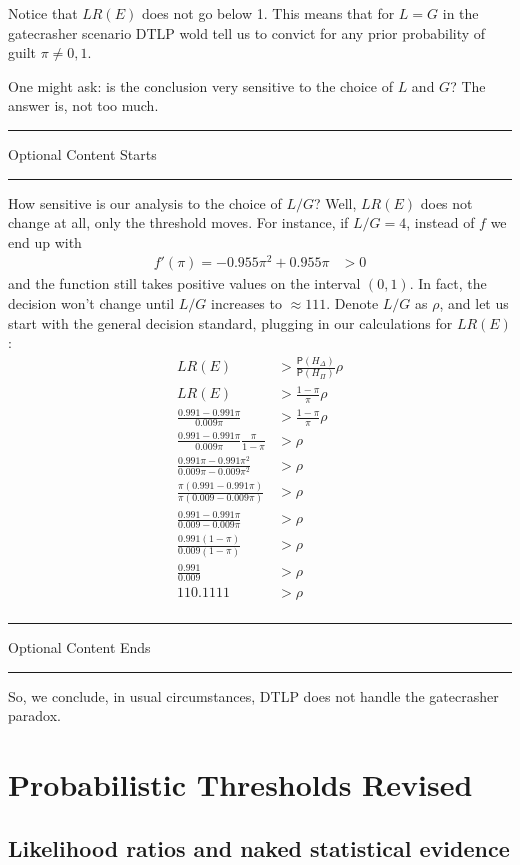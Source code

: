 \documentclass[10pt,dvipsnames,enabledeprecatedfontcommands]{scrartcl}
\newcommand{\pr}[1]{\mathsf{P}(#1)}
\newcommand{\intermezzoa}{
	\begin{minipage}[c]{13cm}
	\begin{center}\rule{10cm}{0.4pt}



	\tiny{\sc Optional Content Starts}
	
	\vspace{-1mm}
	
	\rule{10cm}{0.4pt}\end{center}
	\end{minipage}\nopagebreak 
	}
\newcommand{\intermezzob}{\nopagebreak 
	\begin{minipage}[c]{13cm}
	\begin{center}\rule{10cm}{0.4pt}

	\tiny{\sc Optional Content Ends}
	
	\vspace{-1mm}
	
	\rule{10cm}{0.4pt}\end{center}
	\end{minipage}
	}
\begin{document}
\noindent Notice that \(LR(E)\) does not go below 1. This means that for
\(L=G\) in the gatecrasher scenario DTLP wold tell us to convict for any
prior probability of guilt \(\pi\neq 0,1\).

One might ask: is the conclusion very sensitive to the choice of \(L\)
and \(G\)? The answer is, not too much.

\intermezzoa

How sensitive is our analysis to the choice of \(L/G\)? Well, \(LR(E)\)
does not change at all, only the threshold moves. For instance, if
\(L/G=4\), instead of \(f\) we end up with \begin{align*}
 f'(\pi) = - 0.955 \pi^2 + 0.955\pi &>0 
 \end{align*} and the function still takes positive values on the
interval \((0,1)\). In fact, the decision won't change until \(L/G\)
increases to \(\approx 111\). Denote \(L/G\) as \(\rho\), and let us
start with the general decision standard, plugging in our calculations
for \(LR(E)\): \begin{align*}
LR(E) &> \frac{\pr{H_\Delta}}{\pr{H_\Pi}} \rho\\
LR(E) &> \frac{1-\pi}{\pi} \rho \\
\frac{0.991-0.991\pi}{0.009\pi} &> \frac{1-\pi}{\pi} \rho\\
\frac{0.991-0.991\pi}{0.009\pi}\frac{\pi}{1-\pi} &>  \rho\\
\frac{0.991\pi-0.991\pi^2}{0.009\pi-0.009\pi^2} &>  \rho\\
\frac{\pi(0.991-0.991\pi)}{\pi(0.009-0.009\pi)} &>  \rho\\
\frac{0.991-0.991\pi}{0.009-0.009\pi} &>  \rho\\
\frac{0.991(1-\pi)}{0.009(1-\pi)} &>  \rho\\
\frac{0.991}{0.009} &>  \rho\\
110.1111 &>  \rho\\
\end{align*}

\intermezzob

So, we conclude, in usual circumstances, DTLP does not handle the
gatecrasher paradox.

\hypertarget{probabilistic-thresholds-revised}{%
\section{Probabilistic Thresholds
Revised}\label{probabilistic-thresholds-revised}}

\hypertarget{likelihood-ratios-and-naked-statistical-evidence}{%
\subsection{Likelihood ratios and naked statistical
evidence}\label{likelihood-ratios-and-naked-statistical-evidence}}
\end{document}
